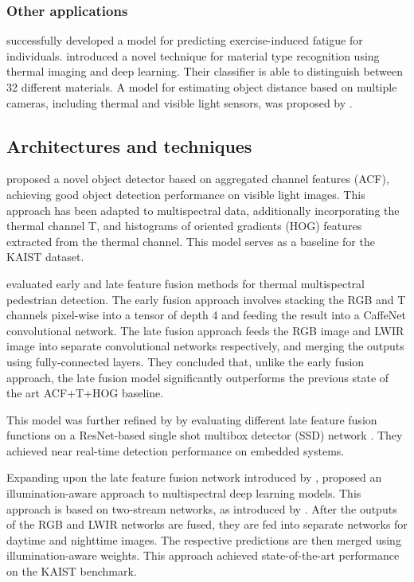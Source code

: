\documentclass{l4proj}
\begin{document}
\subsubsection{Other applications}

\citet{lopez_detecting_2017} successfully developed a model for predicting exercise-induced fatigue for individuals. \citet{cho_deep_2018} introduced a novel technique for material type recognition using thermal imaging and deep learning. Their classifier is able to distinguish between 32 different materials. A model for estimating object distance based on multiple cameras, including thermal and visible light sensors, was proposed by \citet{abdul_multi-disnet_2019}.

\subsection{Architectures and techniques}

\citet{dollar_fast_2014} proposed a novel object detector based on aggregated channel features (ACF), achieving good object detection performance on visible light images. This approach has been adapted to multispectral data, additionally incorporating the thermal channel T, and histograms of oriented gradients (HOG) features \citep{dalal_histograms_2005} extracted from the thermal channel. This model serves as a baseline for the KAIST dataset.

\citet{wagner_multispectral_2016} evaluated early and late feature fusion methods for thermal multispectral pedestrian detection. The early fusion approach involves stacking the RGB and T channels pixel-wise into a tensor of depth 4 and feeding the result into a CaffeNet \citep{jia_caffe_2014} convolutional network. The late fusion approach feeds the RGB image and LWIR image into separate convolutional networks respectively, and merging the outputs using fully-connected layers. They concluded that, unlike the early fusion approach, the late fusion model significantly outperforms the previous state of the art ACF+T+HOG baseline. 

This model was further refined by \citet{osin_fast_2018} by evaluating different late feature fusion functions on a ResNet-based single shot multibox detector (SSD) network \citep{liu_ssd_2016}. They achieved near real-time detection performance on embedded systems.

Expanding upon the late feature fusion network introduced by \citet{wagner_multispectral_2016}, \citet{guan_fusion_2019} proposed an illumination-aware approach to multispectral deep learning models. This approach is based on two-stream networks, as introduced by \citet{simonyan_two-stream_2014}. After the outputs of the RGB and LWIR networks are fused, they are fed into separate networks for daytime and nighttime images. The respective predictions are then merged using illumination-aware weights. This approach achieved state-of-the-art performance on the KAIST benchmark.
\end{document}
